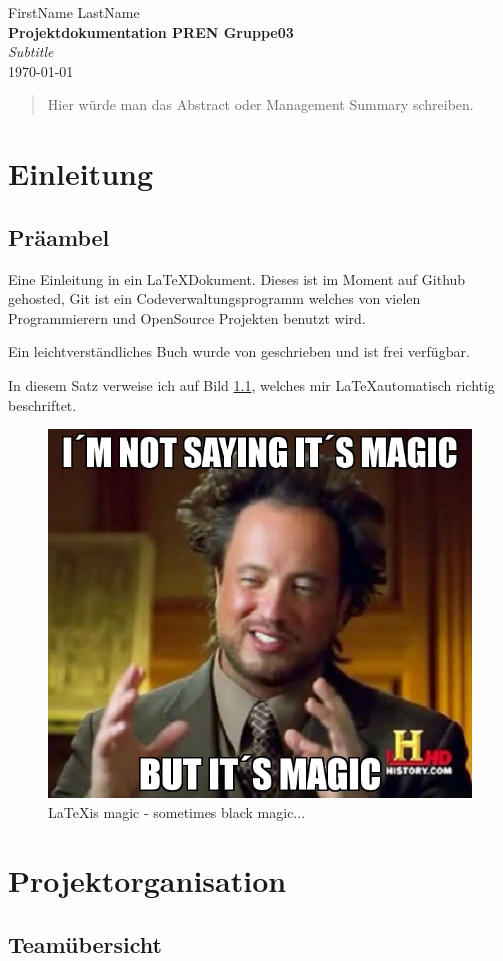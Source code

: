 \documentclass[a4paper]{report}
\newcommand*{\titleAP}{\begingroup %
	\centering
	\vspace*{\baselineskip} %
	
	{\Large FirstName LastName}\\[0.167\textheight] %
	
	{\Huge\bfseries Projektdokumentation PREN Gruppe03}\\[\baselineskip]
	
	{\Large \textit{Subtitle}}\\
	\today
	
	\vspace*{3\baselineskip} %
	\endgroup}
\begin{document}
\titleAP

\newpage

\begin{abstract}
	Hier würde man das Abstract oder Management Summary schreiben.
\end{abstract}

\tableofcontents

\newpage

\chapter{Einleitung}
\label{ch:Intro}

\section{Präambel}
Eine Einleitung in ein \LaTeX Dokument. 
Dieses ist im Moment auf Github gehosted, Git ist ein Codeverwaltungsprogramm welches von vielen Programmierern und OpenSource Projekten benutzt wird. \parencite{Git2017}

Ein leichtverständliches Buch wurde von \citeauthor{Chacon2016} geschrieben und ist frei verfügbar.

In diesem Satz verweise ich auf Bild \ref{fig:MemeMagic}, welches mir \LaTeX automatisch richtig beschriftet.

\begin{figure}[h!]
	\centering
	\includegraphics[width=0.5\linewidth,keepaspectratio]{MemeMagic}
	\caption{\LaTeX is magic - sometimes black magic...}
	\label{fig:MemeMagic}
\end{figure}

\chapter{Projektorganisation}

\section{Teamübersicht}
\end{document}

